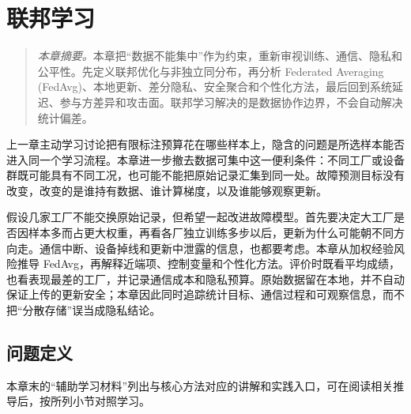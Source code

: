 \chapter{联邦学习}
\begin{quote}\small
\textit{本章摘要。}本章把“数据不能集中”作为约束，重新审视训练、通信、隐私和公平性。先定义联邦优化与非独立同分布，再分析 Federated Averaging (FedAvg)、本地更新、差分隐私、安全聚合和个性化方法，最后回到系统延迟、参与方差异和攻击面。联邦学习解决的是数据协作边界，不会自动解决统计偏差。
\end{quote}
上一章主动学习讨论把有限标注预算花在哪些样本上，隐含的问题是所选样本能否进入同一个学习流程。本章进一步撤去数据可集中这一便利条件：不同工厂或设备群既可能具有不同工况，也可能不能把原始记录汇集到同一处。故障预测目标没有改变，改变的是谁持有数据、谁计算梯度，以及谁能够观察更新。

假设几家工厂不能交换原始记录，但希望一起改进故障模型。首先要决定大工厂是否因样本多而占更大权重，再看各厂独立训练多步以后，更新为什么可能朝不同方向走。通信中断、设备掉线和更新中泄露的信息，也都要考虑。本章从加权经验风险推导 FedAvg，再解释近端项、控制变量和个性化方法。评价时既看平均成绩，也看表现最差的工厂，并记录通信成本和隐私预算。原始数据留在本地，并不自动保证上传的更新安全；本章因此同时追踪统计目标、通信过程和可观察信息，而不把“分散存储”误当成隐私结论。
\section{问题定义}

本章末的“辅助学习材料”列出与核心方法对应的讲解和实践入口，可在阅读相关推导后，按所列小节对照学习。

